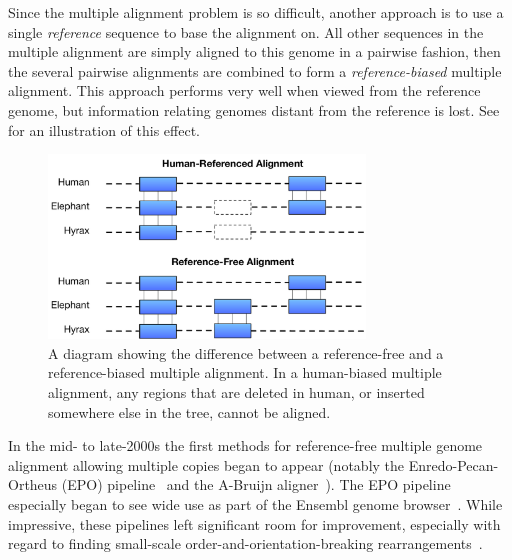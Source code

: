 \documentclass[fleqn,10pt]{wlscirep}
\begin{document}
Since the multiple alignment problem is so difficult, another approach is to use a single \emph{reference} sequence to base the alignment on.
All other sequences in the multiple alignment are simply aligned to this genome in a pairwise fashion, then the several pairwise alignments are combined to form a \emph{reference-biased} multiple alignment.
This approach performs very well when viewed from the reference genome, but information relating genomes distant from the reference is lost.
See  for an illustration of this effect.

\begin{figure}
\begin{center}
\includegraphics[width=0.75\textwidth]{reference-free-diagram}
\caption{A diagram showing the difference between a reference-free and a reference-biased multiple alignment. In a human-biased multiple alignment, any regions that are deleted in human, or inserted somewhere else in the tree, cannot be aligned.}\label{fig:referencefree}
\end{center}
\end{figure}

In the mid- to late-2000s the first methods for reference-free multiple genome alignment allowing multiple copies began to appear (notably the Enredo-Pecan-Ortheus (EPO) pipeline~\cite{epo} and the A-Bruijn aligner~\cite{aBruijn}).
The EPO pipeline especially began to see wide use as part of the Ensembl genome browser~\cite{ensembl2017}.
While impressive, these pipelines left significant room for improvement, especially with regard to finding small-scale order-and-orientation-breaking rearrangements~\cite{epo}.
\end{document}
